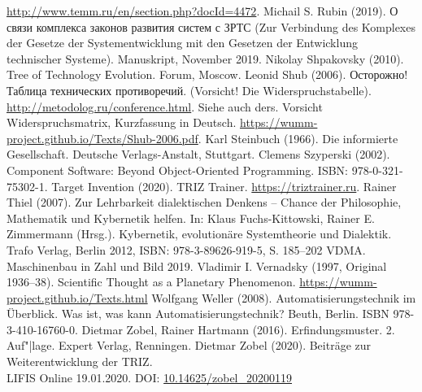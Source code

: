 \documentclass[11pt,a4paper]{article}
\begin{document}
\begin{thebibliography}{xxx}
  \url{http://www.temm.ru/en/section.php?docId=4472}.
 Michail S. Rubin (2019).  \foreignlanguage{russian}{О
  связи комплекса законов развития систем с ЗРТС} (Zur Verbindung des
  Komplexes der Gesetze der Systementwicklung mit den Gesetzen der Entwicklung
  technischer Systeme). Manuskript, November 2019.
 Nikolay Shpakovsky (2010).  Tree of Technology
  Еvolution. Forum, Moscow.
 Leonid Shub (2006). \foreignlanguage{russian}{Осторожно!
  Таблица технических противоречий}. (Vorsicht! Die Widerspruchstabelle).
  \url{http://metodolog.ru/conference.html}. Siehe auch ders. Vorsicht
  Widerspruchsmatrix, Kurzfassung in Deutsch.
  \url{https://wumm-project.github.io/Texts/Shub-2006.pdf}.
 Karl Steinbuch (1966). Die informierte Gesellschaft.
  Deutsche Verlags-Anstalt, Stuttgart.
 Clemens Szyperski (2002). Component Software: Beyond
  Object-Oriented Programming. ISBN: 978-0-321-75302-1.
 Target Invention (2020). TRIZ Trainer.
  \url{https://triztrainer.ru}.
 Rainer Thiel (2007). Zur Lehrbarkeit dialektischen Denkens
  – Chance der Philosophie, Mathematik und Kybernetik helfen. In: Klaus
  Fuchs-Kittowski, Rainer E. Zimmermann (Hrsg.). Kybernetik, evolutionäre
  Systemtheorie und Dialektik. Trafo Verlag, Berlin 2012, ISBN:
  978-3-89626-919-5, S. 185--202
 VDMA. Maschinenbau in Zahl und Bild 2019. 
 Vladimir I. Vernadsky (1997, Original 1936--38).
  Scientific Thought as a Planetary Phenomenon.
  \url{https://wumm-project.github.io/Texts.html}
 Wolfgang Weller (2008). Automatisierungstechnik im
  Überblick. Was ist, was kann Automatisierungstechnik? Beuth, Berlin. ISBN
  978-3-410-16760-0.
 Dietmar Zobel, Rainer Hartmann (2016). Erfindungsmuster.
  2. Auf"|lage.  Expert Verlag, Renningen.
 Dietmar Zobel (2020). Beiträge zur Weiterentwicklung der
  TRIZ.\\  LIFIS Online 19.01.2020. DOI: \url{10.14625/zobel_20200119}
\end{thebibliography}
\end{document}
